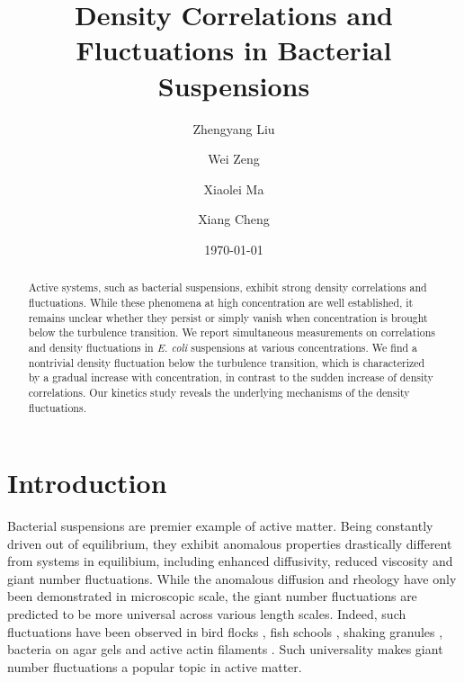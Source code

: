 \documentclass[twocolumn,aps,pre,amsmath,amssymb,longbibliography]{revtex4-1}
\begin{document}
\title{Density Correlations and Fluctuations in Bacterial Suspensions}

\author{Zhengyang Liu}
\author{Wei Zeng}
\author{Xiaolei Ma}
\author{Xiang Cheng}



\date{\today}


\begin{abstract}
Active systems, such as bacterial suspensions, exhibit strong density correlations and  fluctuations. While these phenomena at high concentration are well established, it remains unclear whether they persist or simply vanish when concentration is brought below the turbulence transition. We report simultaneous measurements on correlations and density fluctuations in \textit{E. coli} suspensions at various concentrations. We find a nontrivial density fluctuation below the turbulence transition, which is characterized by a gradual increase with concentration, in contrast to the sudden increase of density correlations. Our kinetics study reveals the underlying mechanisms of the density fluctuations.
\end{abstract}



\maketitle
\section{Introduction}

Bacterial suspensions are premier example of active matter. Being constantly driven out of equilibrium, they exhibit anomalous properties drastically different from systems in equilibium, including enhanced diffusivity, reduced viscosity and giant number fluctuations. While the anomalous diffusion and rheology have only been demonstrated in microscopic scale, the giant number fluctuations are predicted to be more universal across various length scales. Indeed, such fluctuations have been observed in bird flocks \cite{Ballerini1232}, fish schools \cite{Ward6948}, shaking granules \cite{Narayan105}, bacteria on agar gels \cite{Zhang13626} and active actin filaments \cite{Schaller4488}. Such universality makes giant number fluctuations a popular topic in active matter.
\end{document}
